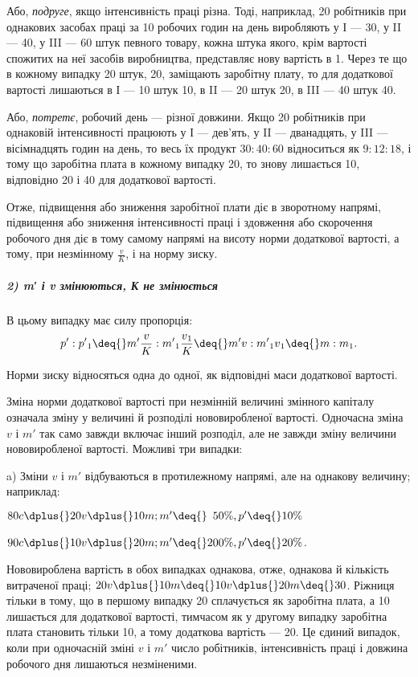 Або, \emph{подруге}, якщо інтенсивність праці різна. Тоді, наприклад,
20 робітників при однакових засобах праці за 10 робочих
годин на день виробляють у І — 30, у II — 40, у III — 60 штук
певного товару, кожна штука якого, крім вартості спожитих
на неї засобів виробництва, представляє нову вартість в 1. Через те що в кожному випадку 20 штук, \deq{} 20, заміщають заробітну плату, то для додаткової
вартості лишаються в І — 10 штук \deq{} 10,
в II — 20 штук \deq{} 20, в III — 40 штук \deq{} 40.

Або, \emph{потретє}, робочий день — різної довжини. Якщо 20 робітників
при однаковій інтенсивності працюють у І — дев’ять,
у II — дванадцять, у III — вісімнадцять годин на день, то весь їх
продукт $30 : 40 : 60$ відноситься як $9 : 12 : 18$, і тому що заробітна
плата в кожному випадку \deq{} 20, то знову лишається 10, відповідно
20 і 40 для додаткової вартості.

Отже, підвищення або зниження заробітної плати діє в зворотному
напрямі, підвищення або зниження інтенсивності праці
і здовження або скорочення робочого дня діє в тому самому
напрямі на висоту норми додаткової вартості, а тому, при незмінному
$\frac{v}{K}$, і на норму зиску.

\subparagraph*{2) m′ і v змінюються, К не змінюється}
В цьому випадку має силу пропорція:\[
p': p'\textsubscript{1} \deq{} m' \frac{v}{K} : m'\textsubscript{1} \frac{v\textsubscript{1}}{K} \deq{} m'v : m'\textsubscript{1}v\textsubscript{1} \deq{} m : m\textsubscript{1}.\]

Норми зиску відносяться одна до одної, як відповідні маси
додаткової вартості.

Зміна норми додаткової вартості при незмінній величині змінного
капіталу означала зміну у величині й розподілі нововиробленої
вартості. Одночасна зміна $v$ і $m'$ так само завжди включає
інший розподіл, але не завжди зміну величини нововиробленої
вартості. Можливі три випадки:

a) Зміни $v$ і $m'$ відбуваються в протилежному напрямі, але
на однакову величину; наприклад:
\begin{center}
$80 c \dplus{} 20 v \dplus{} 10 m; m' \deq{} \phantom{0}50\%, p' \deq{} 10\%$

$90 c \dplus{} 10 v \dplus{} 20 m; m' \deq{} 200\%, p' \deq{} 20\%$.
\end{center}
Нововироблена вартість в обох випадках однакова, отже, однакова
й кількість витраченої праці; $20 v \dplus{} 10 m \deq{} 10 v \dplus{} 20 m \deq{} 30$.
Ріжниця тільки в тому, що в першому випадку 20 сплачується
як заробітна плата, а 10 лишається для додаткової вартості,
тимчасом як у другому випадку заробітна плата становить
тільки 10, а тому додаткова вартість — 20. Це єдиний випадок,
коли при одночасній зміні $v$ і $m'$ число робітників, інтенсивність
праці і довжина робочого дня лишаються незміненими.

